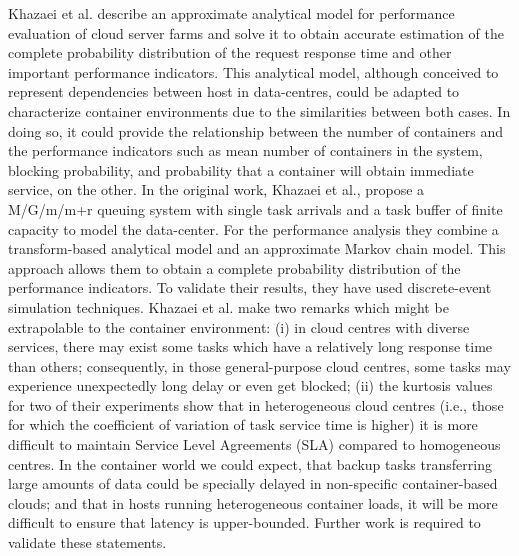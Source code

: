 \documentclass[conference]{IEEEtran}
\begin{document}
Khazaei et al. \cite{IEEE_2012:Khazaei} describe an approximate analytical model for performance evaluation of cloud server farms and solve it to obtain accurate estimation of the complete probability distribution of the request response time and other important performance indicators. This analytical model, although conceived to represent dependencies between host in data-centres, could be adapted to characterize container environments due to the similarities between both cases. In doing so, it could provide the relationship between the number of containers and the performance indicators such as mean number of containers in the system, blocking probability, and probability that a container will obtain immediate service, on the other. In the original work, Khazaei et al., propose a M/G/m/m+r queuing system with single task arrivals and a task buffer of finite capacity to model the data-center. For the performance analysis they combine a transform-based analytical model and an approximate Markov chain model. This approach allows them to obtain a complete probability distribution of the performance indicators. To validate their results, they have used discrete-event simulation techniques. Khazaei et al. make two remarks which might be extrapolable to the container environment: (i) in cloud centres with diverse services, there may exist some tasks which have a relatively long response time than others; consequently, in those general-purpose cloud centres, some tasks may experience unexpectedly long delay or even get blocked; (ii) the kurtosis values for two of their experiments show that in heterogeneous cloud centres (i.e., those for which the coefficient of variation of task service time is higher) it is more difficult to maintain Service Level Agreements (SLA) compared to homogeneous centres. In the container world we could expect, that backup tasks transferring large amounts of data could be specially delayed in non-specific container-based clouds; and that in hosts running heterogeneous container loads, it will be more difficult to ensure that latency is upper-bounded. Further work is required to validate these statements.
\end{document}
